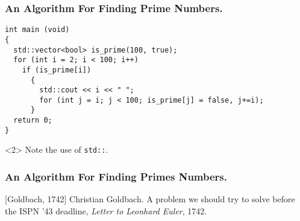 \documentclass{beamer}
\begin{document}
\begin{frame}[fragile]
  \frametitle{An Algorithm For Finding Prime Numbers.}

\begin{verbatim}
int main (void)
{
  std::vector<bool> is_prime(100, true);
  for (int i = 2; i < 100; i++)
    if (is_prime[i])
      {
        std::cout << i << " ";
        for (int j = i; j < 100; is_prime[j] = false, j+=i);
      }
  return 0;
}
\end{verbatim}
  \begin{uncoverenv}<2> Note the use of \verb|std::|.
  \end{uncoverenv}
\end{frame}

\begin{frame}[fragile]
  \frametitle{An Algorithm For Finding Primes Numbers.}
\begin{semiverbatim}
\end{semiverbatim}
\end{frame}


\begin{thebibliography}{10}
[Goldbach, 1742] Christian Goldbach. \newblock A problem
  we should try to solve before the ISPN '43 deadline, \newblock \emph{Letter to
    Leonhard Euler}, 1742.
\end{thebibliography}
\end{document}
